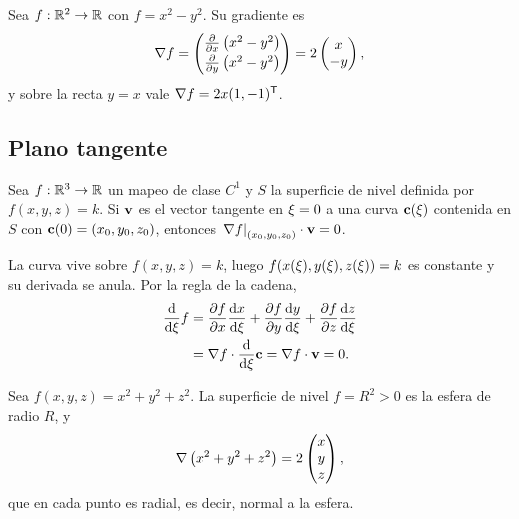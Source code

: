 \begin{ejemplo}
  \label{ej:gradiente_silla}
  Sea $f:\mathbb{R}^2\rightarrow\mathbb{R}$ con $f=x^2-y^2$. Su gradiente es
  \begin{equation}
    \label{eq:gradiente_silla}
    \nabla f=
    \begin{pmatrix}
      \frac{\partial }{\partial x}\left( x^2-y^2 \right)\\[2pt]
      \frac{\partial }{\partial y}\left( x^2-y^2 \right)
    \end{pmatrix}
    =2
    \begin{pmatrix}
      x\\-y
    \end{pmatrix},
  \end{equation}
  y sobre la recta $y=x$ vale $\nabla f=2x(1,-1)^{\mathsf{T}}$.
\end{ejemplo}

\subsection{Plano tangente}
\label{subsec:plano_tangente}

\begin{teorema}
  \label{teo:gradiente_normal}
  Sea $f:\mathbb{R}^3\rightarrow\mathbb{R}$ un mapeo de clase $C^1$ y $S$ la superficie de
  nivel definida por $f(x,y,z)=k$. Si $\mathbf{v}$ es el vector tangente en
  $\xi=0$ a una curva $\mathbf{c}(\xi)$ contenida en $S$ con
  $\mathbf{c}(0)=(x_0,y_0,z_0)$, entonces
  $\left. \nabla f \right|_{(x_0,y_0,z_0)}\cdot\mathbf{v}=0$.
\end{teorema}

\begin{demostracion}
  La curva vive sobre $f(x,y,z)=k$, luego
  $f(x(\xi),y(\xi),z(\xi))=k$ es constante y su derivada se anula. Por la
  regla de la cadena,
  \begin{equation}
    \label{eq:demo_gradiente_normal}
    \begin{aligned}
      \frac{\mathrm{d}}{\mathrm{d}\xi}f
        &=\frac{\partial f}{\partial x}\frac{\mathrm{d}x}{\mathrm{d}\xi}+\frac{\partial f}{\partial y}\frac{\mathrm{d}y}{\mathrm{d}\xi}
          +\frac{\partial f}{\partial z}\frac{\mathrm{d}z}{\mathrm{d}\xi}\\
        &=\nabla f\cdot\frac{\mathrm{d}}{\mathrm{d}\xi}\mathbf{c}
         =\nabla f\cdot\mathbf{v}=0 .
    \end{aligned}
  \end{equation}
\end{demostracion}

\begin{ejemplo}
  \label{ej:esfera_nivel}
  Sea $f(x,y,z)=x^2+y^2+z^2$. La superficie de nivel $f=R^2>0$ es la esfera de
  radio $R$, y
  \begin{equation}
    \label{eq:gradiente_esfera}
    \nabla\left( x^2+y^2+z^2 \right)=2
    \begin{pmatrix}
      x\\y\\z
    \end{pmatrix},
  \end{equation}
  que en cada punto es radial, es decir, normal a la esfera.
\end{ejemplo}


